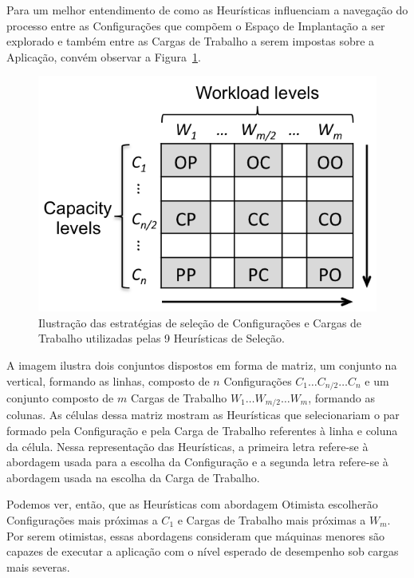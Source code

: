\documentclass[12pt]{article}
\begin{document}
Para um melhor entendimento de como as Heurísticas influenciam a navegação do 
processo entre as Configurações que compõem o Espaço de Implantação a ser explorado
e também entre as Cargas de Trabalho a serem impostas sobre a Aplicação, convém
observar a Figura~\ref{fig:heuristicas}.

\begin{figure}[t]
  \begin{center}
    \includegraphics[scale=.8]{img/heuristics}
  \end{center}
  \caption{\label{fig:heuristicas}Ilustração das estratégias de seleção de Configurações e Cargas de Trabalho utilizadas pelas 9 Heurísticas de Seleção.}
\end{figure}

A imagem ilustra dois conjuntos dispostos em forma de matriz, um conjunto 
na vertical, formando as linhas, composto de $n$ Configurações $C_1 \ldots C_{n/2} 
\ldots C_n$ e um conjunto composto de $m$ Cargas de Trabalho $W_1 \ldots W_{m/2} 
\ldots W_m$, formando as colunas. As células dessa matriz mostram as Heurísticas
que selecionariam o par formado pela Configuração e pela Carga de Trabalho referentes
à linha e coluna da célula. Nessa representação das Heurísticas, a primeira letra
refere-se à abordagem usada para a escolha da Configuração e a segunda letra refere-se 
à abordagem usada na escolha da Carga de Trabalho.
 
Podemos ver, então, que as Heurísticas com abordagem Otimista escolherão Configurações 
mais próximas a $C_1$ e Cargas de Trabalho mais próximas a $W_m$. Por serem otimistas, essas 
abordagens consideram que máquinas menores são capazes de executar a aplicação com o nível esperado de desempenho sob cargas 
mais severas.
\end{document}
